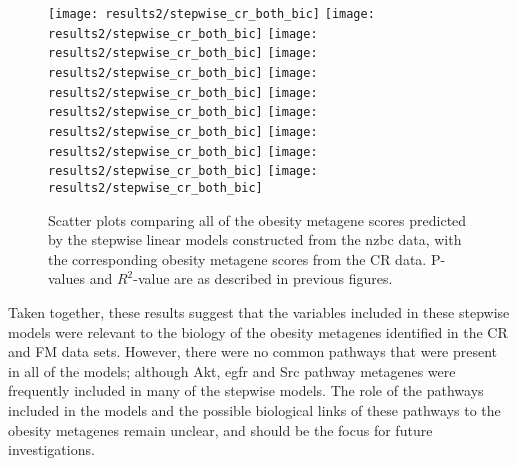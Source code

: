 \begin{figure}[htpb]
	\centering
	\texttt{[image: results2/stepwise\_cr\_both\_bic]}
	\texttt{[image: results2/stepwise\_cr\_both\_bic]}
	\texttt{[image: results2/stepwise\_cr\_both\_bic]}
	\texttt{[image: results2/stepwise\_cr\_both\_bic]}
	\texttt{[image: results2/stepwise\_cr\_both\_bic]}
	\texttt{[image: results2/stepwise\_cr\_both\_bic]}
	\texttt{[image: results2/stepwise\_cr\_both\_bic]}
	\texttt{[image: results2/stepwise\_cr\_both\_bic]}
	\texttt{[image: results2/stepwise\_cr\_both\_bic]}
	\texttt{[image: results2/stepwise\_cr\_both\_bic]}
	\caption[Comparison of all the obesity metagene scores predicted from the stepwise linear models with the original obesity metagene scores from the CR data]{Scatter plots comparing all of the obesity metagene scores predicted by the stepwise linear models constructed from the \gls{nzbc} data, with the corresponding obesity metagene scores from the CR data.
	P-values and $R^2$-value are as described in previous figures.}
	\label{fig:stepwise_cr}
\end{figure}

Taken together, these results suggest that the variables included in these stepwise models were relevant to the biology of the obesity metagenes identified in the CR and FM data sets.
However, there were no common pathways that were present in all of the models; although Akt, \gls{egfr} and Src pathway metagenes were frequently included in many of the stepwise models.
The role of the pathways included in the models and the possible biological links of these pathways to the obesity metagenes remain unclear, and should be the focus for future investigations.

